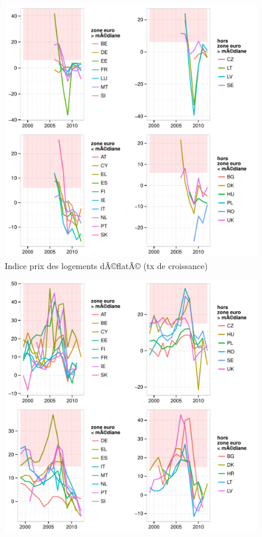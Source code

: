 \documentclass{article}\usepackage[]{graphicx}\usepackage[]{color}
\makeatletter
\def\maxwidth{ %
  \ifdim\Gin@nat@width>\linewidth
    \linewidth
  \else
    \Gin@nat@width
  \fi
}
\newenvironment{knitrout}{}{} %
\makeatother
\begin{document}
\begin{knitrout}
\begin{figure}[p]
{\centering \includegraphics[width=\maxwidth]{figure_graph/byind6} 

}

\caption[Indice prix des logements dÃ©flatÃ© (tx de croissance)]{Indice prix des logements dÃ©flatÃ© (tx de croissance)\label{fig:byind6}}
\end{figure}

\begin{figure}[p]


{\centering \includegraphics[width=\maxwidth]{figure_graph/byind7} 

}
\end{figure}
\end{knitrout}
\end{document}
